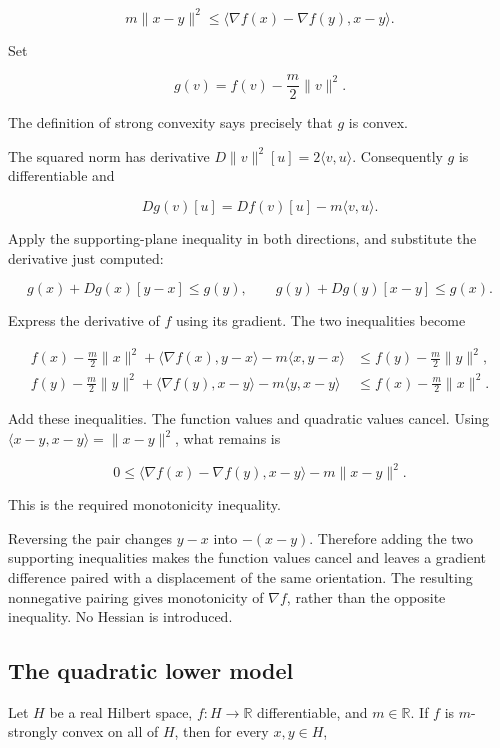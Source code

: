 \documentclass[11pt,a4paper]{article}
\begin{document}
\[m\|x-y\|^2\le\langle\nabla f(x)-\nabla f(y),x-y\rangle.\]

Set

\[g(v)=f(v)-\frac m2\|v\|^2.\]

The definition of strong convexity says precisely that \(g\) is convex.



The squared norm has derivative \(D\|v\|^2[u]=2\langle v,u\rangle\). Consequently \(g\) is differentiable and

\[Dg(v)[u]=Df(v)[u]-m\langle v,u\rangle.\]

Apply the supporting-plane inequality in both directions, and substitute the derivative just computed:

\[g(x)+Dg(x)[y-x]\le g(y),\qquad g(y)+Dg(y)[x-y]\le g(x).\]

Express the derivative of \(f\) using its gradient. The two inequalities become

\[\begin{aligned}f(x)-\tfrac m2\|x\|^2+\langle\nabla f(x),y-x\rangle-m\langle x,y-x\rangle&\le f(y)-\tfrac m2\|y\|^2,\\ f(y)-\tfrac m2\|y\|^2+\langle\nabla f(y),x-y\rangle-m\langle y,x-y\rangle&\le f(x)-\tfrac m2\|x\|^2.\end{aligned}\]

Add these inequalities. The function values and quadratic values cancel. Using \(\langle x-y,x-y\rangle=\|x-y\|^2\), what remains is

\[0\le\langle\nabla f(x)-\nabla f(y),x-y\rangle-m\|x-y\|^2.\]

This is the required monotonicity inequality.



Reversing the pair changes \(y-x\) into \(-(x-y)\). Therefore adding the two supporting inequalities makes the function values cancel and leaves a gradient difference paired with a displacement of the same orientation. The resulting nonnegative pairing gives monotonicity of \(\nabla f\), rather than the opposite inequality. No Hessian is introduced.


\subsection{\texorpdfstring{The quadratic lower model}{The quadratic lower model}}


Let \(H\) be a real Hilbert space, \(f:H\to\mathbb R\) differentiable, and \(m\in\mathbb R\). If \(f\) is \(m\)-strongly convex on all of \(H\), then for every \(x,y\in H\),
\end{document}
